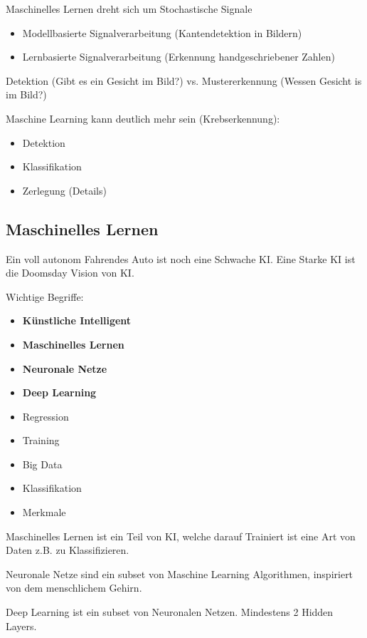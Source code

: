 \documentclass[a4paper]{article}
\begin{document}
Maschinelles Lernen dreht sich um Stochastische Signale

\begin{itemize}
    \item Modellbasierte Signalverarbeitung (Kantendetektion in Bildern)
    \item Lernbasierte Signalverarbeitung (Erkennung handgeschriebener Zahlen)
\end{itemize}

Detektion (Gibt es ein Gesicht im Bild?) vs. Mustererkennung (Wessen Gesicht is im Bild?)

Maschine Learning kann deutlich mehr sein (Krebserkennung):

\begin{itemize}
    \item Detektion
    \item Klassifikation
    \item Zerlegung (Details)
\end{itemize}

\subsection{Maschinelles Lernen}

Ein voll autonom Fahrendes Auto ist noch eine Schwache KI. Eine Starke KI ist die Doomsday Vision von KI.

Wichtige Begriffe:

\begin{itemize}
    \item \textbf{Künstliche Intelligent}
    \item \textbf{Maschinelles Lernen}
    \item \textbf{Neuronale Netze}
    \item \textbf{Deep Learning}
    \item Regression
    \item Training
    \item Big Data
    \item Klassifikation
    \item Merkmale
\end{itemize}

Maschinelles Lernen ist ein Teil von KI, welche darauf Trainiert ist eine Art von Daten z.B. zu Klassifizieren.

Neuronale Netze sind ein subset von Maschine Learning Algorithmen, inspiriert von dem menschlichem Gehirn.

Deep Learning ist ein subset von Neuronalen Netzen. Mindestens 2 Hidden Layers.
\end{document}
